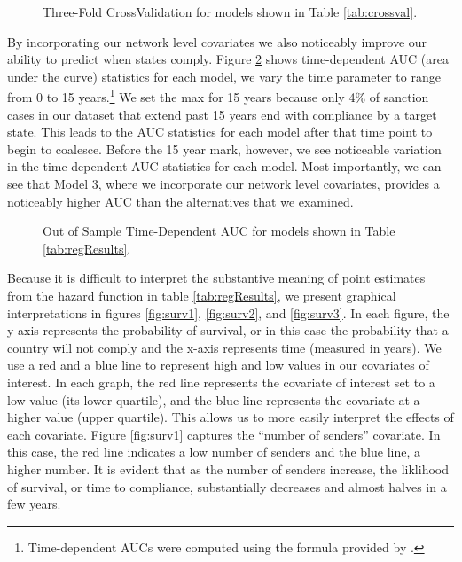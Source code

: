 \begin{figure}[ht]
	\centering
	\caption{Three-Fold CrossValidation for models shown in Table \ref{tab:crossval}.}
	\resizebox{0.8\textwidth}{!}{}
	\label{fig:crossval}
\end{figure}
\FloatBarrier

By incorporating our network level covariates we also noticeably improve our ability to predict when states comply. Figure \ref{fig:auc} shows time-dependent AUC (area under the curve) statistics for each model, we vary the time parameter to range from 0 to 15 years.\footnote{Time-dependent AUCs were computed using the formula provided by \citet{chambless2006estimation}.} We set the max for 15 years because only 4\% of sanction cases in our dataset that extend past 15 years end with compliance by a target state. This leads to the AUC statistics for each model after that time point to begin to coalesce. Before the 15 year mark, however, we see noticeable variation in the time-dependent AUC statistics for each model. Most importantly, we can see that Model 3, where we incorporate our network level covariates, provides a noticeably higher AUC than the alternatives that we examined.

\begin{figure}[ht]
	\centering
	\caption{Out of Sample Time-Dependent AUC for models shown in Table \ref{tab:regResults}.}
	\resizebox{0.8\textwidth}{!}{}
	\label{fig:auc}
\end{figure}
\FloatBarrier

Because it is difficult to interpret the substantive meaning of point estimates from the hazard function in table \ref{tab:regResults}, we present graphical interpretations in figures \ref{fig:surv1}, \ref{fig:surv2}, and \ref{fig:surv3}. In each figure, the y-axis represents the probability of survival, or in this case the probability that a country will not comply and the x-axis represents time (measured in years). We use a red and a blue line to represent high and low values in our covariates of interest. In each graph, the red line represents the covariate of interest set to a low value (its lower quartile), and the blue line represents the covariate at a higher value (upper quartile). This allows us to more easily interpret the effects of each covariate. Figure \ref{fig:surv1} captures the ``number of senders'' covariate. In this case, the red line indicates a low number of senders and the blue line, a higher number. It is evident that as the number of senders increase, the liklihood of survival, or time to compliance, substantially decreases and almost halves in a few years. 

